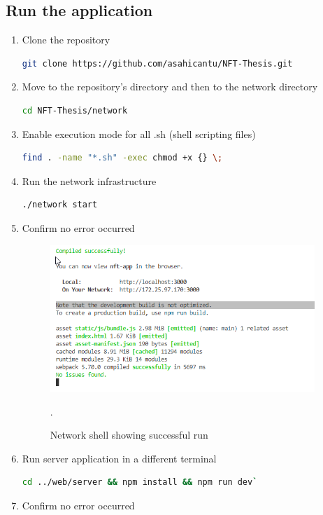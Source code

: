 \subsection{Run the application}
\begin{enumerate}
    \item Clone the repository
    \begin{lstlisting}[language=sh]
    git clone https://github.com/asahicantu/NFT-Thesis.git
    \end{lstlisting}
    \item Move to the repository's directory and then to the network directory
    \begin{lstlisting}[language=sh]
    cd NFT-Thesis/network
    \end{lstlisting}
    \item Enable execution mode for all .sh (shell scripting files)
    \begin{lstlisting}[language=sh]
    find . -name "*.sh" -exec chmod +x {} \;
    \end{lstlisting}
    \item Run the network infrastructure
    \begin{lstlisting}[language=sh]
    ./network start
    \end{lstlisting}
    \item Confirm no error occurred
     \begin{figure}[!h]
        \centering
        \includegraphics[width=10cm]{img/Client_Shell.png}
        \caption{Network shell showing successful run}.
        \label{fig:Network_Shell}
    \end{figure}
    \item Run server application in a different terminal
    \begin{lstlisting}[language=sh]
    cd ../web/server && npm install && npm run dev`
    \end{lstlisting}
    \item Confirm no error occurred

\end{enumerate}
